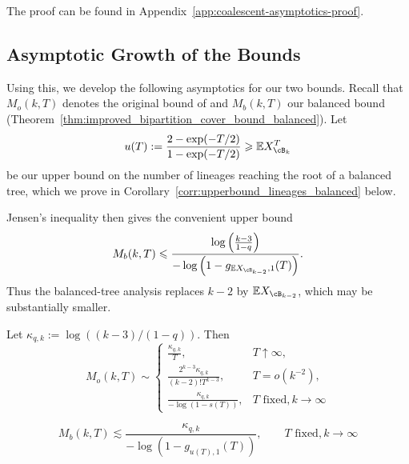 \noindent The proof can be found in Appendix~\ref{app:coalescent-asymptotics-proof}.

\subsection{Asymptotic Growth of the Bounds}
\label{sec:asymptotic-bound-growth}

Using this, we develop the following asymptotics for our two bounds. Recall
that $M_o(k,T)$ denotes the original bound of \citet{uricchio2016_bipartition_cover} and $M_b(k,T)$
our balanced bound (Theorem~\ref{thm:improved_bipartition_cover_bound_balanced}). Let
%
    \[u(T) := \frac{2-\exp(-T/2)}{1-\exp(-T/2)} \geq \E X_{\cB_k}^T\]
%
\noindent be our upper bound on the number of lineages reaching the root
of a balanced tree, which we prove in Corollary~\ref{corr:upperbound_lineages_balanced} below.

Jensen's inequality then gives the convenient upper bound
%
\[M_b(k,T) \leq \frac{\log\left(\frac{k-3}{1-q}\right)}{-\log\left(1-g_{\E X_{\cB_{k-2}}, 1}(T)\right)}.\]
%
Thus the balanced-tree analysis replaces $k-2$ by $\E X_{\cB_{k-2}}$, which may be
substantially smaller.

\begin{lemma}
\label{lem:bound_asymptotics}
    Let $\kappa_{q,k} := \log((k-3)/(1-q))$. Then
    \[M_o(k,T)  \sim \begin{cases}
    \frac{\kappa_{q,k}}{T}, & T \uparrow \infty, \\
    \frac{2^{k-3}\kappa_{q,k}}{(k-2)! T^{k-3}}, & T = o(k^{-2}), \\
    \frac{\kappa_{q,k}}{-\log(1-s(T))}, & T \text{ fixed}, k \to \infty
\end{cases}\]

    \[M_b(k,T) \lesssim
        \frac{\kappa_{q,k}}{-\log(1-g_{u(T), 1}(T))}, \qquad T \text{ fixed}, k \to \infty\]

\end{lemma}

